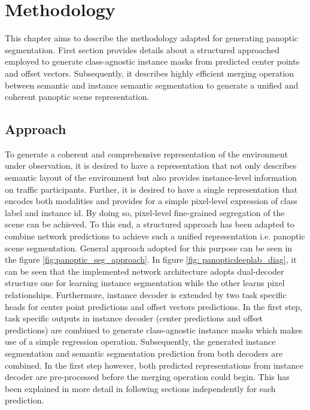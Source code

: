 
\chapter{Methodology}
\label{sec:methodology}

This chapter aims to describe the methodology adapted for generating panoptic segmentation. First section provides details about a structured approached employed to generate class-agnostic instance masks from predicted center points and offset vectors. Subsequently, it describes highly efficient merging operation between semantic and instance semantic segmentation to generate a unified and coherent panoptic scene representation.

\bigskip

\section{Approach}

 To generate a coherent and comprehensive representation of the environment under observation, it is desired to have a representation that not only describes semantic layout of the environment but also provides instance-level information on traffic participants. Further, it is desired to have a single representation that encodes both modalities and provides for a simple pixel-level expression of class label and instance id. By doing so, pixel-level fine-grained segregation of the scene can be achieved. To this end, a structured approach has been adapted to combine network predictions to achieve such a unified representation i.e. panoptic scene segmentation. General approach adopted for this purpose can be seen in the figure  \ref{fig:panoptic_seg_approach}. In figure \ref{fig: panopticdeeplab_diag}, it can be seen that the implemented network architecture adopts dual-decoder structure one for learning instance segmentation while the other learns pixel relationships. Furthermore, instance decoder is extended by two task specific heads for center point predictions and offset vectors predictions. In the first step, task specific outputs in instance decoder (center predictions and offset predictions) are combined to generate class-agnostic instance masks which makes use of a simple regression operation. Subsequently, the generated instance segmentation and semantic segmentation prediction from both decoders are combined. In the first step however, both predicted representations from instance decoder are pre-processed before the merging operation could begin. This has been explained in more detail in following sections independently for each prediction.

